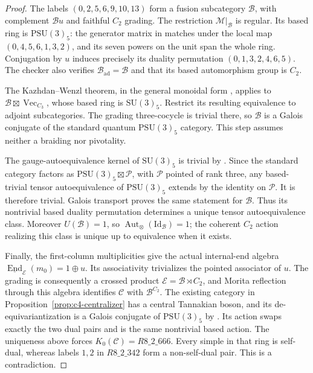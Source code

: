 \begin{proof}
The labels $(0,2,5,6,9,10,13)$ form a fusion subcategory
$\mathcal B$, with complement $\mathcal Bu$ and faithful
$C_2$ grading. The restriction $\mathcal M|_{\mathcal B}$
is regular. Its based ring is $\mathrm{PSU}(3)_5$:
the generator matrix in \cite[Section~2.4]{BRWRealizing}
matches under the local map $(0,4,5,6,1,3,2)$, and its
seven powers on the unit span the whole ring.
Conjugation by $u$ induces precisely its duality permutation
$(0,1,3,2,4,6,5)$. The checker also verifies
$\mathcal B_{\mathrm{ad}}=\mathcal B$ and that its based
automorphism group is $C_2$.

The Kazhdan--Wenzl theorem, in the general monoidal form
\cite[Theorem~5.1]{FMRReconstruction}, applies to
$\mathcal B\boxtimes\operatorname{Vec}_{C_3}$, whose based
ring is $\mathrm{SU}(3)_5$. Restrict its resulting equivalence
to adjoint subcategories. The grading three-cocycle is trivial
there, so $\mathcal B$ is a Galois conjugate of the standard
quantum $\mathrm{PSU}(3)_5$ category. This step assumes
neither a braiding nor pivotality.

The gauge-autoequivalence kernel of $\mathrm{SU}(3)_5$ is
trivial by \cite[Theorem~1.1 and Section~3]{EdieSU3}.
Since the standard category factors as
$\mathrm{PSU}(3)_5\boxtimes\mathcal P$, with $\mathcal P$
pointed of rank three, any based-trivial tensor autoequivalence
of $\mathrm{PSU}(3)_5$ extends by the identity on $\mathcal P$.
It is therefore trivial. Galois transport proves the same
statement for $\mathcal B$. Thus its nontrivial based duality
permutation determines a unique tensor autoequivalence class.
Moreover $U(\mathcal B)=1$, so
$\operatorname{Aut}_{\otimes}(\mathrm{Id}_{\mathcal B})=1$;
the coherent $C_2$ action realizing this class is unique up to
equivalence when it exists.

Finally, the first-column multiplicities give the actual
internal-end algebra
$\underline{\operatorname{End}}_{\mathcal E}(m_0)=1\oplus u$.
Its associativity trivializes the pointed associator of $u$.
The grading is consequently a crossed product
$\mathcal E=\mathcal B\rtimes C_2$, and Morita reflection
through this algebra identifies $\mathcal C$ with
$\mathcal B^{C_2}$.
The existing category in Proposition~\ref{prop:c4-centralizer}
has a central Tannakian boson, and its de-equivariantization
is a Galois conjugate of $\mathrm{PSU}(3)_5$ by
\cite[Section~2.4]{BRWRealizing}. Its action swaps exactly
the two dual pairs and is the same nontrivial based action.
The uniqueness above forces $K_0(\mathcal C)=R8\_2\_666$.
Every simple in that ring is self-dual, whereas labels $1,2$
in $R8\_2\_342$ form a non-self-dual pair. This is a
contradiction.
\end{proof}

